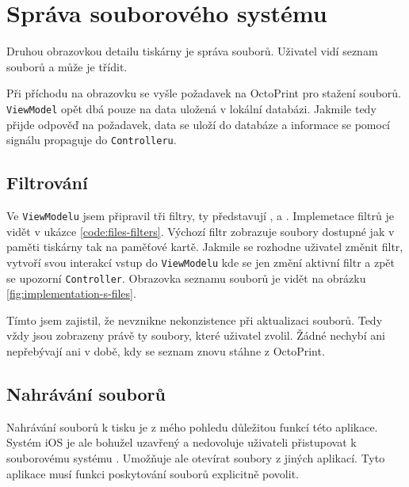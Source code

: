 \section{Správa souborového systému}

Druhou obrazovkou detailu tiskárny je správa souborů.
Uživatel vidí seznam souborů a může je třídit.

Při příchodu na obrazovku se vyšle požadavek na OctoPrint pro stažení souborů.
\texttt{ViewModel} opět dbá pouze na data uložená v lokální databázi.
Jakmile tedy přijde odpověď na požadavek, data se uloží do databáze a informace se pomocí signálu propaguje do \texttt{Controlleru}.

\subsection{Filtrování}

Ve \texttt{ViewModelu} jsem připravil tři filtry, ty představují ,  a .
Implemetace filtrů je vidět v ukázce \ref{code:files-filters}.
Výchozí filtr zobrazuje soubory dostupné jak v paměti tiskárny tak na paměťové kartě.
Jakmile se rozhodne uživatel změnit filtr, vytvoří svou interakcí vstup do \texttt{ViewModelu} kde se jen změní aktivní filtr a zpět se upozorní \texttt{Controller}.
Obrazovka seznamu souborů je vidět na obrázku \ref{fig:implementation-s-files}.



Tímto jsem zajistil, že nevznikne nekonzistence při aktualizaci souborů.
Tedy vždy jsou zobrazeny právě ty soubory, které uživatel zvolil.
Žádné nechybí ani nepřebývají ani v době, kdy se seznam znovu stáhne z OctoPrint.

\subsection{Nahrávání souborů}

Nahrávání souborů k tisku je z mého pohledu důležitou funkcí této aplikace.
Systém iOS je ale bohužel uzavřený a nedovoluje uživateli přistupovat k souborovému systému \cite{imobile-access-fs}.
Umožňuje ale otevírat soubory z jiných aplikací.
Tyto aplikace musí funkci poskytování souborů explicitně povolit.

